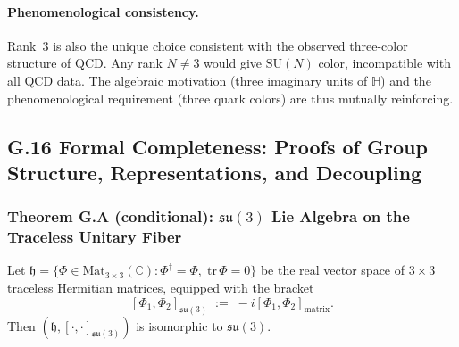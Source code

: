 \paragraph{Phenomenological consistency.}
Rank~3 is also the unique choice consistent with the observed three-color structure of QCD.
Any rank $N\neq 3$ would give $\mathrm{SU}(N)$ color, incompatible with all QCD data.
The algebraic motivation (three imaginary units of $\mathbb{H}$) and the phenomenological
requirement (three quark colors) are thus mutually reinforcing.

\subsection*{G.16 Formal Completeness: Proofs of Group Structure, Representations, and Decoupling}
\label{sec:G16_formal_proofs}

\subsubsection*{Theorem G.A (conditional): $\mathfrak{su}(3)$ Lie Algebra on the Traceless Unitary Fiber}

\begin{tcolorbox}[colback=blue!3!white,colframe=blue!40!black,title=Theorem G.A (conditional on the unitary-carrier postulate)]
Let $\mathfrak{h} = \{\Phi\in\mathrm{Mat}_{3\times3}(\mathbb{C}) : \Phi^\dagger=\Phi,\;\mathrm{tr}\,\Phi=0\}$
be the real vector space of $3\times3$ traceless Hermitian matrices, equipped with the bracket
\[[\Phi_1,\Phi_2]_{\mathfrak{su}(3)} \;:=\; -i[\Phi_1,\Phi_2]_{\mathrm{matrix}}.\]
Then $(\mathfrak{h},[\cdot,\cdot]_{\mathfrak{su}(3)})$ is isomorphic to $\mathfrak{su}(3)$.
\end{tcolorbox}

